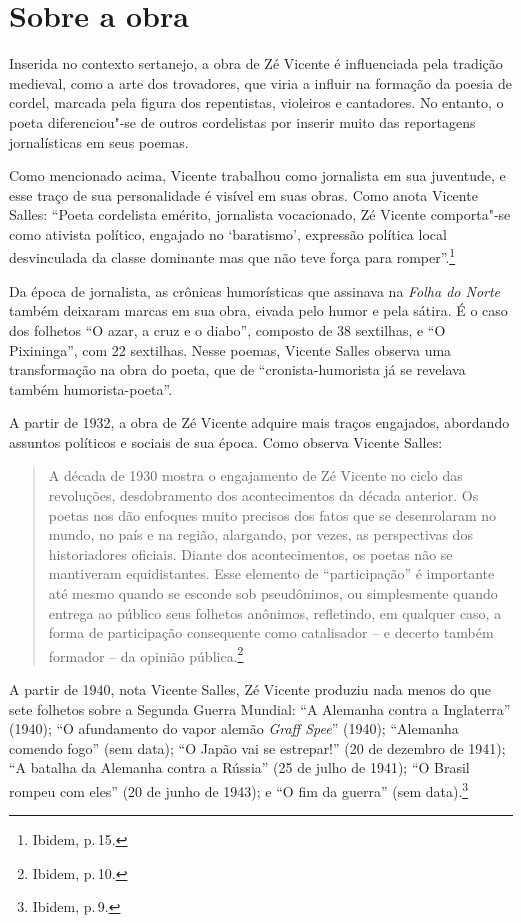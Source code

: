 \section{Sobre a obra}

Inserida no contexto sertanejo, a obra de Zé Vicente é influenciada pela tradição medieval, como a arte dos trovadores, que viria a influir na formação da poesia de cordel, marcada pela figura dos repentistas, violeiros e cantadores.
No entanto, o poeta diferenciou"-se de outros cordelistas por inserir muito das reportagens jornalísticas em seus poemas.

Como mencionado acima, Vicente trabalhou como jornalista em sua juventude, e esse traço de sua personalidade é visível em suas obras.
Como anota Vicente Salles: ``Poeta cordelista emérito, jornalista vocacionado, Zé Vicente
comporta"-se como ativista político, engajado no `baratismo',
expressão política local desvinculada da classe dominante mas que não
teve força para romper''.\footnote{Ibidem, p.\,15.}

Da época de jornalista, as crônicas humorísticas que assinava na \textit{Folha do Norte} também deixaram marcas em sua obra, eivada pelo humor e pela sátira.
É o caso dos folhetos ``O azar, a cruz e o diabo'', composto de 38 sextilhas, e ``O
Pixininga'', com 22 sextilhas. Nesse poemas, Vicente Salles observa uma transformação na obra do poeta, que de ``cronista-humorista já se revelava também humorista-poeta''.

A partir de 1932, a obra de Zé Vicente adquire mais traços engajados, abordando assuntos políticos e sociais de sua época. Como observa Vicente Salles:

\begin{quote}
A década de 1930 mostra o engajamento de Zé Vicente no ciclo das
revoluções, desdobramento dos acontecimentos da década anterior. Os
poetas nos dão enfoques muito precisos dos fatos que se desenrolaram
no mundo, no país e na região, alargando, por vezes, as perspectivas
dos historiadores oficiais. Diante dos acontecimentos, os poetas não
se mantiveram equidistantes. Esse elemento de “participação” é
importante até mesmo quando se esconde sob pseudônimos, ou
simplesmente quando entrega ao público seus folhetos anônimos,
refletindo, em qualquer caso, a forma de participação consequente
como catalisador -- e decerto também formador -- da opinião pública.\footnote{Ibidem, p.\,10.}
\end{quote}

A partir de 1940, nota Vicente Salles, Zé Vicente produziu nada
menos do que sete folhetos sobre a Segunda Guerra Mundial: ``A Alemanha contra a
Inglaterra'' (1940); ``O afundamento do vapor alemão \textit{Graff Spee}'' (1940);
``Alemanha comendo fogo'' (sem data); ``O Japão vai se estrepar!'' (20 de
dezembro de 1941); ``A batalha da Alemanha contra a Rússia'' (25 de julho
de 1941); ``O Brasil rompeu com eles'' (20 de junho de 1943); e ``O fim da
guerra'' (sem data).\footnote{Ibidem, p.\,9.}

